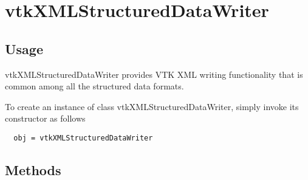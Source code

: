 \section{vtkXMLStructuredDataWriter}

\subsection{Usage}

 vtkXMLStructuredDataWriter provides VTK XML writing functionality that
 is common among all the structured data formats.

To create an instance of class vtkXMLStructuredDataWriter, simply
invoke its constructor as follows
\begin{verbatim}
  obj = vtkXMLStructuredDataWriter
\end{verbatim}
\subsection{Methods}

